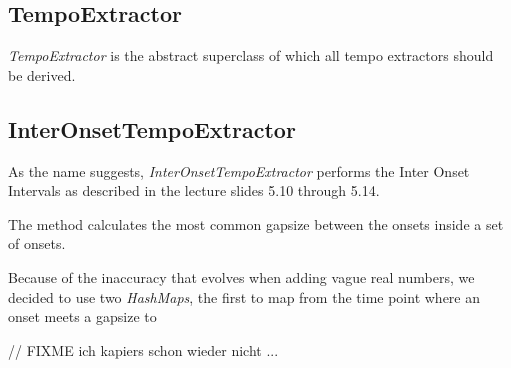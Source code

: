 \subsection{\ttfamily TempoExtractor}
\emph{TempoExtractor} is the abstract superclass of which all tempo extractors
should be derived.

\subsection{\ttfamily InterOnsetTempoExtractor}
As the name suggests, \emph{InterOnsetTempoExtractor} performs the Inter Onset
Intervals as described in the lecture slides 5.10 through 5.14.

The method calculates the most common gapsize between the onsets inside a set of
onsets. 

Because of the inaccuracy that evolves when adding vague real numbers, we
decided to use two \emph{HashMaps}, the first to map from the time point
where an onset meets a gapsize to 

// FIXME ich kapiers schon wieder nicht ...
